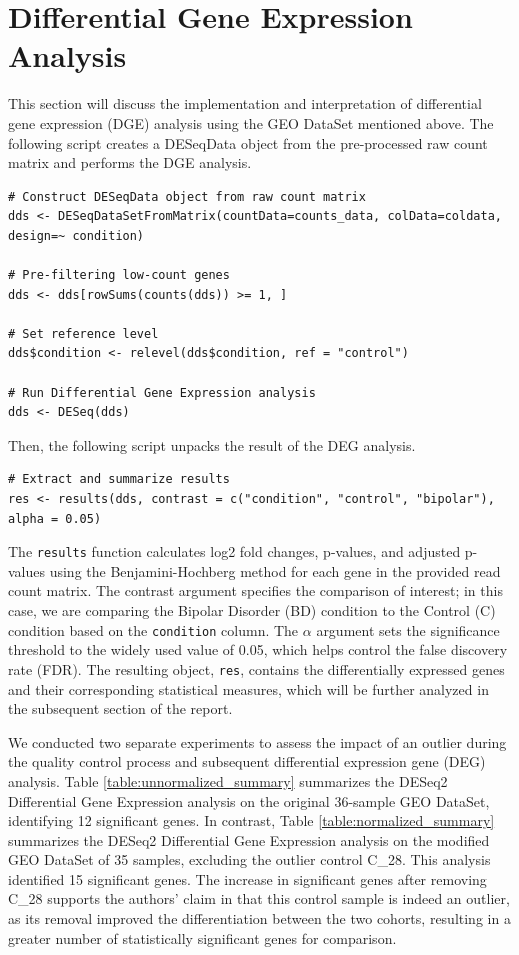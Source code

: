 \section{Differential Gene Expression Analysis}
This section will discuss the implementation and interpretation of differential gene expression (DGE) analysis using the GEO DataSet mentioned above. The following script creates a DESeqData object from the pre-processed raw count matrix and performs the DGE analysis.
\begin{verbatim}
# Construct DESeqData object from raw count matrix
dds <- DESeqDataSetFromMatrix(countData=counts_data, colData=coldata, design=~ condition)

# Pre-filtering low-count genes
dds <- dds[rowSums(counts(dds)) >= 1, ]

# Set reference level
dds$condition <- relevel(dds$condition, ref = "control")

# Run Differential Gene Expression analysis
dds <- DESeq(dds)
\end{verbatim}
Then, the following script unpacks the result of the DEG analysis.
\begin{verbatim}
# Extract and summarize results
res <- results(dds, contrast = c("condition", "control", "bipolar"), alpha = 0.05)
\end{verbatim}
The \texttt{results} function calculates log2 fold changes, p-values, and adjusted p-values using the Benjamini-Hochberg method for each gene in the provided read count matrix. The contrast argument specifies the comparison of interest; in this case, we are comparing the Bipolar Disorder (BD) condition to the Control (C) condition based on the \texttt{condition} column. The $\alpha$ argument sets the significance threshold to the widely used value of 0.05, which helps control the false discovery rate (FDR). The resulting object, \texttt{res}, contains the differentially expressed genes and their corresponding statistical measures, which will be further analyzed in the subsequent section of the report.

We conducted two separate experiments to assess the impact of an outlier during the quality control process and subsequent differential expression gene (DEG) analysis. Table \ref{table:unnormalized_summary} summarizes the DESeq2 Differential Gene Expression analysis on the original 36-sample GEO DataSet, identifying 12 significant genes. In contrast, Table \ref{table:normalized_summary} summarizes the DESeq2 Differential Gene Expression analysis on the modified GEO DataSet of 35 samples, excluding the outlier control C\_28. This analysis identified 15 significant genes. The increase in significant genes after removing C\_28 supports the authors' claim in \cite{pacifico2017transcriptome} that this control sample is indeed an outlier, as its removal improved the differentiation between the two cohorts, resulting in a greater number of statistically significant genes for comparison.

